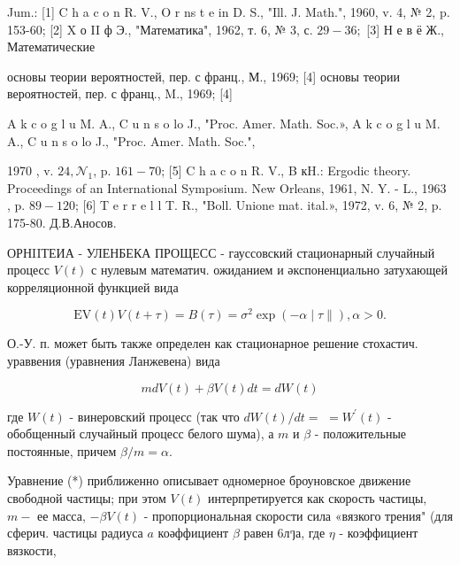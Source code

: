\documentclass[10pt]{article}
\begin{document}
Jum.: [1] C h a c o n R. V., O r ns t e in D. S., "Ill. J. Math.", 1960, v. 4, № 2, p. 153-60; [2] X о II ф Э., "Математика", 1962, т. 6, № 3, с. $29-36 ;$ [3] Н е в ё Ж., Математические

основы теории вероятностей, пер. с франц., М., 1969; [4] основы теории вероятностей, пер. с франц., M., 1969; [4]

A k c o g l u M. A., C u n s o lo J., "Proc. Amer. Math. Soc.», A k c o g l u M. A., C u n s o lo J., "Proc. Amer. Math. Soc.",

1970 , v. $24, \mathcal{N}_{1}$, p. $161-70$; [5] C h a c o n R. V., B кH.: Ergodic theory. Proceedings of an International Symposium. New Orleans, 1961, N. Y. - L., 1963 , p. $89-120$; [6] T e r r e l l T. R., "Boll. Unione mat. ital.», 1972, v. 6, № 2, p. 175-80. Д.В.Аносов.



ОРНIIТЕИА - УЛЕНБЕКА ПРОЩЕСС - гауссовский стационарный случайный процесс $V(t)$ с нулевым математич. ожиданием и әкспоненциально затухающей корреляционной функцией вида



\[

\mathrm{EV}(t) V(t+\tau)=B(\tau)=\sigma^{2} \exp (-\alpha \mid \tau \|), \alpha>0 .

\]



О.-У. п. может быть также определен как стационарное решение стохастич. ураввения (уравнения Ланжевена) вида



\[

m d V(t)+\beta V(t) d t=d W(t)

\]



где $W(t)$ - винеровский процесс (так что $d W(t) / d t=$ $=W^{\prime}(t)$ - обобщенный случайный процесс белого шума), а $m$ и $\beta$ - положительные постоянные, причем $\beta / m=\alpha$.



Уравнение (*) приближенно описывает одномерное броуновское движение свободной частицы; при этом $V(t)$ интерпретируется как скорость частицы, $m-$ ее масса, $-\beta V(t)$ - пропорциональная скорости сила «вязкого трения" (для сферич. частицы радиуса $a$ коәффициент $\beta$ равен 6лๆа, где $\eta$ - коэффициент вязкости,
\end{document}
